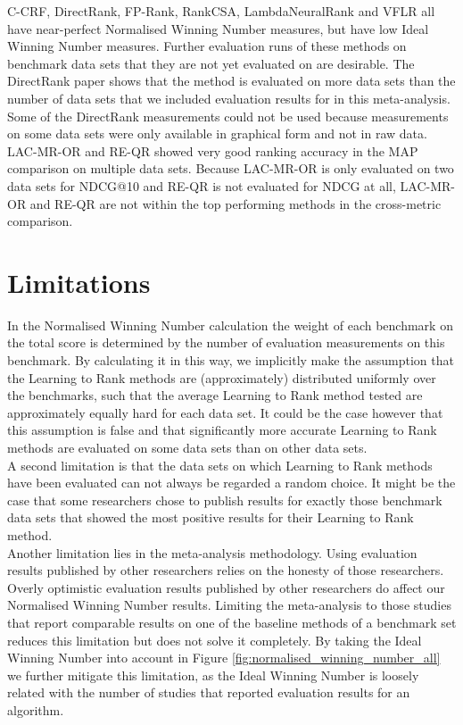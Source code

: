 C-CRF, DirectRank, FP-Rank, RankCSA, LambdaNeuralRank and VFLR all have near-perfect Normalised Winning Number measures, but have low Ideal Winning Number measures. Further evaluation runs of these methods on benchmark data sets that they are not yet evaluated on are desirable. The DirectRank paper \cite{Tan2013} shows that the method  is evaluated on more data sets than the number of data sets that we included evaluation results for in this meta-analysis. Some of the DirectRank measurements could not be used because measurements on some data sets were only available in graphical form and not in raw data.\\

LAC-MR-OR and RE-QR showed very good ranking accuracy in the \ac{MAP} comparison on multiple data sets. Because LAC-MR-OR is only evaluated on two data sets for \ac{NDCG}@10 and RE-QR is not evaluated for \ac{NDCG} at all, LAC-MR-OR and RE-QR are not within the top performing methods in the cross-metric comparison. 

\section{Limitations}
In the Normalised Winning Number calculation the weight of each benchmark on the total score is determined by the number of evaluation measurements on this benchmark. By calculating it in this way, we implicitly make the assumption that the Learning to Rank methods are (approximately) distributed uniformly over the benchmarks, such that the average Learning to Rank method tested are approximately equally hard for each data set. It could be the case however that this assumption is false and that significantly more accurate Learning to Rank methods are evaluated on some data sets than on other data sets. \\

A second limitation is that the data sets on which Learning to Rank methods have been evaluated can not always be regarded a random choice. It might be the case that some researchers chose to publish results for exactly those benchmark data sets that showed the most positive results for their Learning to Rank method.\\

Another limitation lies in the meta-analysis methodology. Using evaluation results published by other researchers relies on the honesty of those researchers. Overly optimistic evaluation results published by other researchers do affect our Normalised Winning Number results. Limiting the meta-analysis to those studies that report comparable results on one of the baseline methods of a benchmark set reduces this limitation but does not solve it completely. By taking the Ideal Winning Number into account in Figure \ref{fig:normalised_winning_number_all} we further mitigate this limitation, as the Ideal Winning Number is loosely related with the number of studies that reported evaluation results for an algorithm.

